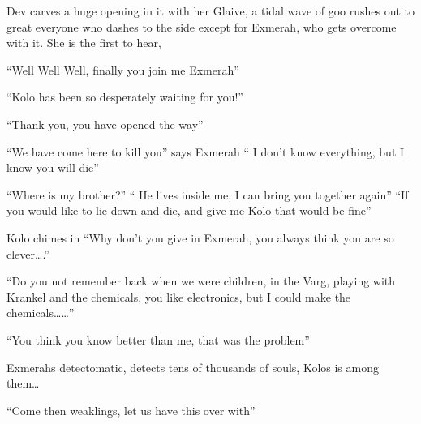Dev carves a huge opening in it with her Glaive, a tidal wave of goo rushes out to great everyone who dashes to the side except for Exmerah, who gets overcome with it. She is the first to hear,\medskip

“Well Well Well, finally you join me Exmerah”\medskip

“Kolo has been so desperately waiting for you!”\medskip

“Thank you, you have opened the way”\medskip

“We have come here to kill you” says Exmerah “ I don’t know everything, but I know you will die”\medskip

“Where is my brother?” “ He lives inside me, I can bring you together again” “If you would like to lie down and die, and give me Kolo that would be fine”\medskip

Kolo chimes in “Why don’t you give in Exmerah, you always think you are so clever….”\medskip

“Do you not remember back when we were children, in the Varg, playing with Krankel and the chemicals, you like electronics, but I could make the chemicals……”\medskip

“You think you know better than me, that was the problem”\medskip

Exmerahs detectomatic, detects tens of thousands of souls, Kolos is among them…\medskip

“Come then weaklings, let us have this over with”\medskip

\vspace*{5mm}
